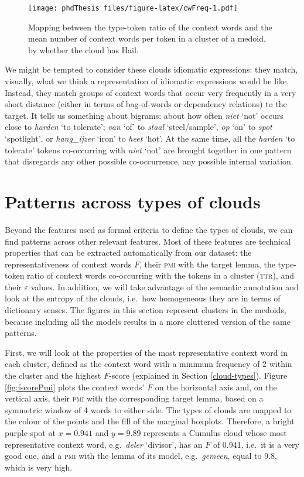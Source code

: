 \documentclass[
]{book}
\begin{document}
\begin{figure}
\centering
\texttt{[image: phdThesis\_files/figure-latex/cwFreq-1.pdf]}
\caption{\label{fig:cwFreq}Mapping between the type-token ratio of the context words and the mean number of context words per token in a cluster of a medoid, by whether the cloud has Hail.}
\end{figure}

We might be tempted to consider these clouds idiomatic expressions: they match, visually, what we think a representation of idiomatic expressions would be like. Instead, they match groups of context words that occur very frequently in a very short distance (either in terms of bag-of-words or dependency relations) to the target. It tells us something about bigrams: about how often \emph{niet} `not' occurs close to \emph{harden} `to tolerate'; \emph{van} `of' to \emph{staal} `steel/sample', \emph{op} `on' to \emph{spot} `spotlight', or \emph{hang\_ijzer} `iron' to \emph{heet} `hot'. At the same time, all the \emph{harden} `to tolerate' tokens co-occurring with \emph{niet} `not' are brought together in one pattern that disregards any other possible co-occurrence, any possible internal variation.

\hypertarget{cloud-patterns}{%
\section{Patterns across types of clouds}\label{cloud-patterns}}

Beyond the features used as formal criteria to define the types of clouds, we can find patterns across other relevant features. Most of these features are technical properties that can be extracted automatically from our dataset: the representativeness of context words \(F\), their \textsc{pmi} with the target lemma, the type-token ratio of context words co-occurring with the tokens in a cluster (\textsc{ttr}), and their \(\varepsilon\) values. In addition, we will take advantage of the semantic annotation and look at the entropy of the clouds, i.e.~how homogeneous they are in terms of dictionary senses. The figures in this section represent clusters in the medoids, because including all the models results in a more cluttered version of the same patterns.

First, we will look at the properties of the most representative context word in each cluster, defined as the context word with a minimum frequency of 2 within the cluster and the highest \(F\)-score (explained in Section \ref{cloud-types}). Figure \ref{fig:fscorePmi} plots the context words' \(F\) on the horizontal axis and, on the vertical axis, their \textsc{pmi} with the corresponding target lemma, based on a symmetric window of 4 words to either side. The types of clouds are mapped to the colour of the points and the fill of the marginal boxplots. Therefore, a bright purple spot at \(x = 0.941\) and \(y = 9.89\) represents a Cumulus cloud whose most representative context word, e.g.~\emph{deler} `divisor', has an \(F\) of 0.941, i.e.~it is a very good cue, and a \textsc{pmi} with the lemma of its model, e.g.~\emph{gemeen}, equal to 9.8, which is very high.
\end{document}
